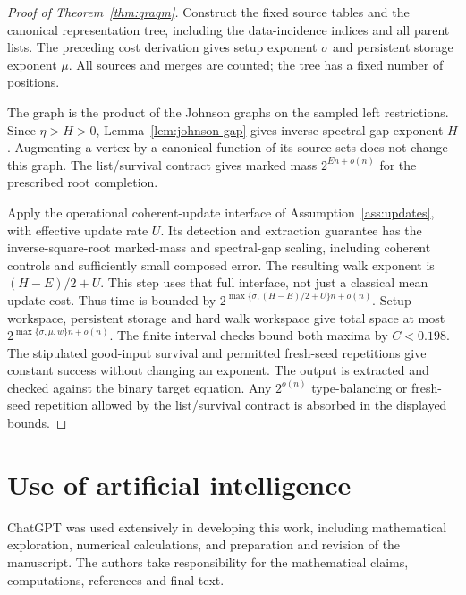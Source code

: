 \documentclass[10pt,a4paper]{article}
\theoremstyle{definition}
\begin{document}
\begin{proof}[Proof of Theorem~\ref{thm:qraqm}]
Construct the fixed source tables and the canonical representation tree,
including the data-incidence indices and all parent lists. The preceding
cost derivation gives setup exponent $\sigma$ and persistent storage
exponent $\mu$. All sources and merges are counted; the tree has a fixed
number of positions.

The graph is the product of the Johnson graphs on the sampled left
restrictions. Since $\eta>H>0$, Lemma~\ref{lem:johnson-gap} gives inverse spectral-gap exponent $H$.
Augmenting a vertex by a canonical function of its source sets does not
change this graph. The list/survival contract gives marked mass
$2^{En+o(n)}$ for the prescribed root completion.

Apply the operational coherent-update interface of
Assumption~\ref{ass:updates}, with effective update rate $U$. Its detection
and extraction guarantee has the inverse-square-root marked-mass and
spectral-gap scaling, including coherent controls and sufficiently small
composed error. The resulting walk exponent is $(H-E)/2+U$.
This step uses that full interface, not just a classical mean update
cost. Thus time is bounded by
$2^{\max\{\sigma,(H-E)/2+U\}n+o(n)}$. Setup workspace, persistent
storage and hard walk workspace give total space at most
$2^{\max\{\sigma,\mu,w\}n+o(n)}$. The finite interval checks bound both
maxima by $C<0.198$. The stipulated good-input survival and permitted
fresh-seed repetitions give constant success without changing an exponent.
The output is extracted and checked against the binary target equation.
Any $2^{o(n)}$ type-balancing or fresh-seed repetition allowed by the
list/survival contract is absorbed in the displayed bounds.
\end{proof}




\appendix

\section{Use of artificial intelligence}
ChatGPT was used extensively in developing this work, including
mathematical exploration, numerical calculations, and preparation and
revision of the manuscript. The authors take responsibility for the
mathematical claims, computations, references and final text.
\end{document}
